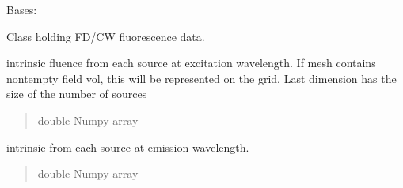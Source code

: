 \documentclass[letterpaper,10pt,english]{sphinxmanual}
\begin{document}
\begin{fulllineitems}
\label{\detokenize{_autosummary/nirfasterff.base.data.FLdata:nirfasterff.base.data.FLdata}}
\pysigstartsignatures
\pysigline
{}
\pysigstopsignatures
\sphinxAtStartPar
Bases: 

\sphinxAtStartPar
Class holding FD/CW fluorescence data.

\begin{fulllineitems}
\label{\detokenize{_autosummary/nirfasterff.base.data.FLdata:nirfasterff.base.data.FLdata.phix}}
\pysigstartsignatures
\pysigline
{}
\pysigstopsignatures
\sphinxAtStartPar
intrinsic fluence from each source at excitation wavelength. If mesh contains non\sphinxhyphen{}tempty field vol, this will be represented on the grid. Last dimension has the size of the number of sources
\begin{quote}\begin{description}
\sphinxAtStartPar
double Numpy array

\end{description}\end{quote}

\end{fulllineitems}


\begin{fulllineitems}
\label{\detokenize{_autosummary/nirfasterff.base.data.FLdata:nirfasterff.base.data.FLdata.phimm}}
\pysigstartsignatures
\pysigline
{}
\pysigstopsignatures
\sphinxAtStartPar
intrinsic from each source at emission wavelength.
\begin{quote}\begin{description}
\sphinxAtStartPar
double Numpy array

\end{description}\end{quote}

\end{fulllineitems}


\end{fulllineitems}
\end{document}
